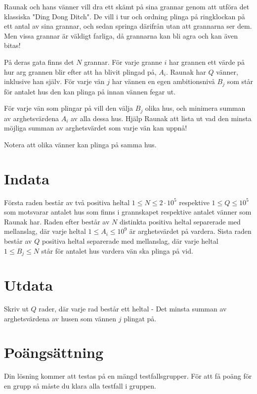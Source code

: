 \noindent
Raunak och hans vänner vill dra ett skämt på sina grannar genom att utföra det klassiska "Ding Dong Ditch". 
De vill i tur och ordning plinga på ringklockan på ett antal av sina grannar, och sedan springa därifrån utan att grannarna ser dem. 
Men vissa grannar är väldigt farliga, då grannarna kan bli agra och kan även bitas!


\noindent
På deras gata finns det $N$ grannar. 
För varje granne $i$ har grannen ett värde på hur arg grannen blir efter att ha blivit plingad på, $A_i$. 
Raunak har $Q$ vänner, inklusive han själv. För varje vän $j$ har vännen en egen ambitionsnivå $B_j$ som står för antalet hus den kan plinga på innan vännen fegar ut. 


\noindent
För varje vän som plingar på vill den välja $B_j$ olika hus, och minimera summan av arghetsvärdena $A_i$ av alla dessa hus. 
Hjälp Raunak att lista ut vad den minsta möjliga summan av arghetsvärdet som varje vän kan uppnå!


\noindent
Notera att olika vänner kan plinga på samma hus.

\section*{Indata}
\noindent
Första raden består av två positiva heltal $1 \leqslant N \leqslant 2 \cdot 10^5$ respektive $1 \leqslant Q \leqslant 10^5$ som motsvarar antalet hus som finns i grannskapet respektive antalet vänner som Raunak har.
Raden efter består av $N$ distinkta positiva heltal separerade med mellanslag, där varje heltal $1 \leqslant A_i \leqslant 10^9$ är arghetsvärdet på vardera.
Sista raden består av $Q$ positiva heltal separerade med mellanslag, där varje heltal $1 \leqslant B_j \leqslant N$ står för antalet hus vardera vän ska plinga på vid.


\section*{Utdata}
\noindent
Skriv ut $Q$ rader, där varje rad består ett heltal - Det minsta summan av arghetsvärdena av husen som vännen $j$ plingat på. 



\section*{Poängsättning}
Din lösning kommer att testas på en mängd testfallsgrupper.
\noindent
För att få poäng för en grupp så måste du klara alla testfall i gruppen.



